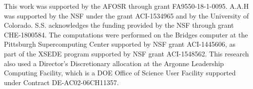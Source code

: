 \documentclass[%
preprint,
 superscriptaddress,
 amsmath,amssymb,
 aps,
]{revtex4-1}
\begin{document}
\begin{acknowledgements}
This work was supported by the AFOSR through grant FA9550-18-1-0095.
A.A.H was supported by the NSF under the grant ACI-1534965 and by the University of Colorado.
S.S. acknowledges the funding provided by the NSF through grant CHE-1800584.
The computations were performed on the Bridges computer at the Pittsburgh Supercomputing Center supported by NSF grant ACI-1445606, as part of the XSEDE program supported by NSF grant ACI-1548562.
This research also used a Director’s Discretionary allocation at the Argonne Leadership Computing Facility, which is
a DOE Office of Science User Facility supported under Contract DE-AC02-06CH11357.
\end{acknowledgements}





%

%


%
\end{document}
